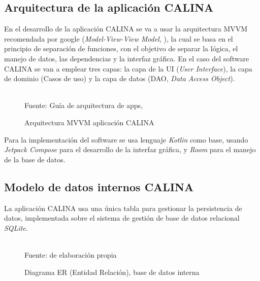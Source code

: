 \subsection{Arquitectura de la aplicación CALINA}

En el desarrollo de la aplicación CALINA se va a usar la arquitectura MVVM recomendada por google 
(\textit{Model-View-View Model}, ), la cual se basa en el principio de separación de 
funciones, con el objetivo de separar la lógica, el manejo de datos, las dependencias y la interfaz gráfica. 
En el caso del software CALINA se van a emplear tres capas: la capa de la UI (\textit{User Interface}), la 
capa de dominio (Casos de uso) y la capa de datos (DAO, \textit{Data Access Object}).

\begin{figure}[ht]
\caption{Arquitectura MVVM aplicación CALINA}
\label{img:arquitectura}
\centering

\\
{\footnotesize Fuente: Guía de arquitectura de apps, }
\end{figure}

Para la implementación del software se usa lenguaje \textit{Kotlin} como base, usando \textit{Jetpack Compose} 
para el desarrollo de la interfaz gráfica, y \textit{Room} para el manejo de la base de datos.

\subsection{Modelo de datos internos CALINA}

La aplicación CALINA usa una única tabla para gestionar la persistencia de datos, implementada sobre el 
sistema de gestión de base de datos relacional \textit{SQLite}.

\begin{figure}[ht]
\caption{Diagrama ER (Entidad Relación), base de datos interna}
\label{img:diagramaER}
\centering

\\
{\footnotesize Fuente: de elaboración propia}
\end{figure}


